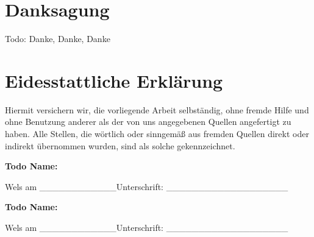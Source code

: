 \chapter*{Danksagung}
\label{danksagungen}
Todo: Danke, Danke, Danke


\newpage
\chapter*{Eidesstattliche Erklärung}
\label{erklaerung}

Hiermit versichern wir, die vorliegende Arbeit selbständig, ohne fremde Hilfe und ohne Benutzung anderer als der von uns angegebenen Quellen angefertigt zu haben. Alle Stellen, die wörtlich oder sinngemäß aus fremden Quellen direkt oder indirekt übernommen wurden, sind als solche gekennzeichnet.
\bigskip
\bigskip
\bigskip
\bigskip

\textbf{Todo Name:}
\bigskip
\bigskip

Wels am ____________\tab[1cm]Unterschrift: ___________________
\bigskip
\bigskip
\bigskip

\textbf{Todo Name:}
\bigskip
\bigskip

Wels am ____________\tab[1cm]Unterschrift: ___________________



